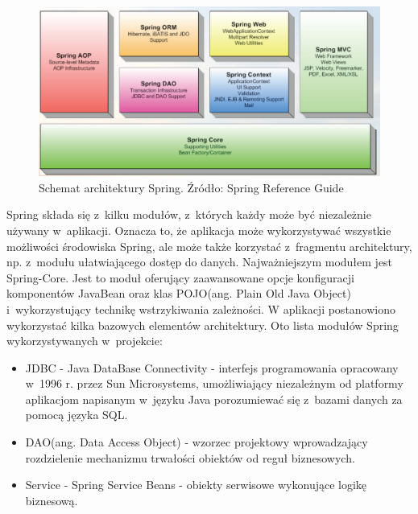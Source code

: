\vspace*{0.1cm}
\begin{figure}[!ht]
\centering
\includegraphics[scale=0.31]{images/spring-modules}
\caption[Rysunek przedstawiający model architektury Spring]{Schemat architektury Spring. Źródło: Spring Reference Guide\cite{spring_reference}}
\label{img:rysunek_spring}
\end{figure}

Spring składa się z~kilku modułów, z~których każdy może być niezależnie używany w~aplikacji. Oznacza to, że aplikacja może wykorzystywać wszystkie możliwości środowiska Spring, ale może także korzystać z~fragmentu architektury, np. z~modułu ułatwiającego dostęp do danych. Najważniejszym modułem jest Spring-Core. Jest to moduł oferujący zaawansowane opcje konfiguracji komponentów JavaBean oraz klas POJO(ang. Plain Old Java Object) i~wykorzystujący technikę wstrzykiwania zależności.
W aplikacji postanowiono wykorzystać kilka bazowych elementów architektury. Oto lista modułów Spring wykorzystywanych w~projekcie:
\begin{itemize}
 \item JDBC - Java DataBase Connectivity - interfejs programowania opracowany w~1996 r. przez Sun Microsystems, umożliwiający niezależnym od platformy aplikacjom napisanym w~języku Java porozumiewać się z~bazami danych za pomocą języka SQL.
 \item DAO(ang. Data Access Object) - wzorzec projektowy wprowadzający rozdzielenie mechanizmu trwałości obiektów od reguł biznesowych.
 \item Service - Spring Service Beans - obiekty serwisowe wykonujące logikę biznesową.
\end{itemize}

